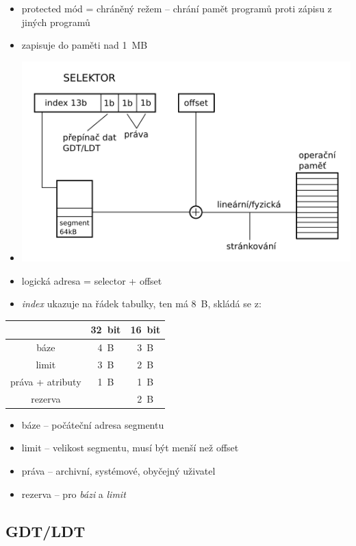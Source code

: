 \documentclass[a4paper,12pt]{article}
\providecommand{\tightlist}{%
\setlength{\itemsep}{0pt}\setlength{\parskip}{0pt}}
\begin{document}
\begin{itemize}
\tightlist
\item protected mód = chráněný režem -- chrání pamět programů proti zápisu z
  jiných programů
\item zapisuje do paměti nad 1~MB
\item[] \includegraphics[width=13.651cm]{ref/vypocet-logicke-adresy.png}
\item logická adresa = selector + offset
\item \emph{index} ukazuje na řádek tabulky, ten má 8~B, skládá se z:
\end{itemize}

\begin{tabular}{|c|c|c|}
\hline
& 32~bit & 16~bit \\ \hline
báze & 4~B & 3~B \\ \hline
limit & 3~B & 2~B \\ \hline
práva + atributy & 1~B & 1~B \\ \hline
rezerva & & 2~B \\ \hline
\end{tabular}

\begin{itemize}
\tightlist
\item báze -- počáteční adresa segmentu
\item limit -- velikost segmentu, musí být menší než offset
\item práva -- archivní, systémové, obyčejný uživatel
\item rezerva -- pro \emph{bázi} a \emph{limit}
\end{itemize}

\subsection{GDT/LDT}
\end{document}
